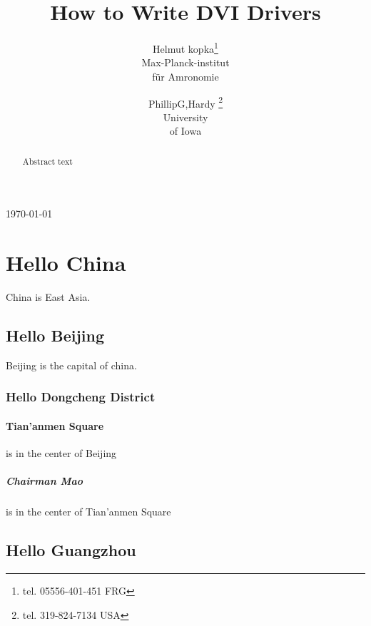 \documentclass[12pt,twoside,a4paper]{article}   %
\begin{document}
	\twocolumn
	\title{How to Write DVI Drivers}
	\author{Helmut kopka\thanks{tel. %
		05556-401-451 FRG}\\ %
		Max-Planck-institut\\
		f\"ur Amronomie
		\and %
		PhillipG,Hardy
		\thanks{tel.
		319-824-7134 USA}\\
		University\\of Iowa}
	\maketitle %
	\pagebreak[1]	%
	\onecolumn
	\begin{abstract}
  	Abstract text
	\end{abstract} %
	\newpage
	\setcounter{tocdepth}{3} %
	\tableofcontents %
	\listoffigures
	\nopagebreak[1]
	\listoftables
	\clearpage
	\today
	\section{Hello China} China is East Asia.
		\subsection{Hello Beijing} Beijing is the capital of china.
			\subsubsection{Hello Dongcheng District}
				\paragraph{Tian'anmen Square} is in the center of Beijing
					\subparagraph{Chairman Mao} is in the center of Tian'anmen Square
			\subsection{Hello Guangzhou}
\end{document}
